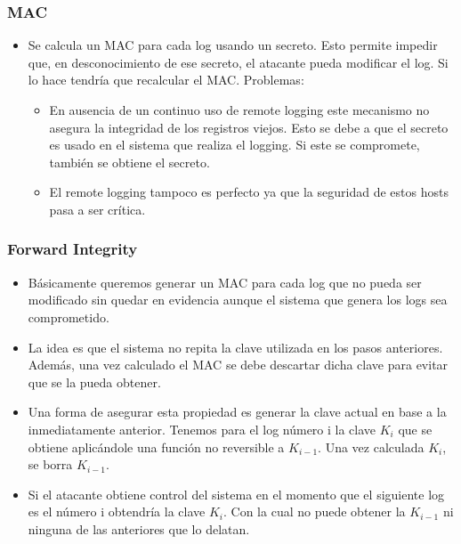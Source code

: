 \documentclass[10pt, a4paper,english,spanish]{beamer}
\begin{document}
\begin{frame}
\frametitle{MAC}
\begin{itemize}
\item Se calcula un MAC para cada log usando un secreto. Esto permite impedir que, en desconocimiento de ese secreto,
el atacante pueda modificar el log. Si lo hace tendría que recalcular el MAC. Problemas:
\begin{itemize}
  \item En ausencia de un continuo uso de remote logging este mecanismo no asegura la integridad de los
  registros viejos. Esto se debe a que el secreto es usado en el sistema que realiza el logging. Si este
  se compromete, también se obtiene el secreto.
  \item El remote logging tampoco es perfecto ya que la seguridad de estos hosts pasa a ser crítica.
\end{itemize}
\end{itemize}
\end{frame}


\begin{frame}
\frametitle{Forward Integrity}
\begin{itemize}
\item Básicamente queremos generar un MAC para cada log que no pueda ser modificado sin quedar en evidencia
aunque el sistema que genera los logs sea comprometido.
\item La idea es que el sistema no repita la clave utilizada en los pasos anteriores. Además, una vez calculado
el MAC se debe descartar dicha clave para evitar que se la pueda obtener.
\item Una forma de asegurar esta propiedad es generar la clave actual en base a la inmediatamente anterior.
Tenemos para el log número i la clave $K_{i}$ que se obtiene aplicándole una función no reversible a
$K_{i-1}$. Una vez calculada $K_{i}$, se borra $K_{i-1}$.
\item Si el atacante obtiene control del sistema en el momento que el siguiente log es el número i
obtendría la clave $K_{i}$. Con la cual no puede obtener la $K_{i-1}$ ni ninguna de las anteriores que
lo delatan.
\end{itemize}
\end{frame}
\end{document}
